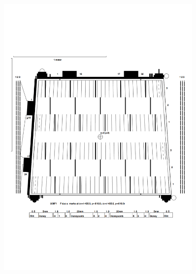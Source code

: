 \begin{figure}[tbp]
		\begin{minipage}{0.49\hsize}
		\centering
        \includegraphics[width=0.9\textwidth]{img/pdf/u08f1i.pdf}
        \subcaption{}
        \end{minipage}
        \begin{minipage}{0.49\hsize}
        \centering

\end{minipage}
\end{figure}
